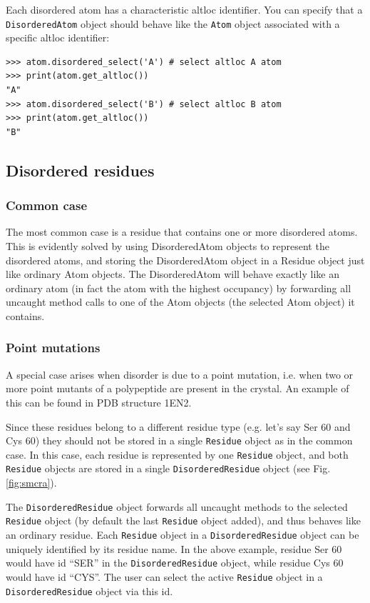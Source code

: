 \documentclass{report}
\begin{document}
Each disordered atom has a characteristic altloc identifier. You can
specify that a \texttt{Disordered\-Atom} object should behave like
the \texttt{Atom} object associated with a specific altloc identifier:

\begin{verbatim}
>>> atom.disordered_select('A') # select altloc A atom
>>> print(atom.get_altloc())
"A"
>>> atom.disordered_select('B') # select altloc B atom
>>> print(atom.get_altloc())
"B"
\end{verbatim}

\subsection{Disordered residues}

\subsubsection*{Common case}

The most common case is a residue that contains one or more disordered atoms.
This is evidently solved by using DisorderedAtom objects to represent the disordered
atoms, and storing the DisorderedAtom object in a Residue object just like ordinary
Atom objects. The DisorderedAtom will behave exactly like an ordinary atom (in
fact the atom with the highest occupancy) by forwarding all uncaught method
calls to one of the Atom objects (the selected Atom object) it contains.

\subsubsection*{Point mutations\label{point mutations}}

A special case arises when disorder is due to a point mutation, i.e. when two
or more point mutants of a polypeptide are present in the crystal. An example
of this can be found in PDB structure 1EN2.

Since these residues belong to a different residue type (e.g. let's
say Ser 60 and Cys 60) they should not be stored in a single \texttt{Residue}
object as in the common case. In this case, each residue is represented
by one \texttt{Residue} object, and both \texttt{Residue} objects
are stored in a single \texttt{Disordered\-Residue} object (see Fig.
\ref{fig:smcra}).

The \texttt{Dis\-ordered\-Residue} object forwards all un\-caught methods to
the selected \texttt{Residue} object (by default the last \texttt{Residue}
object added), and thus behaves like an ordinary residue. Each
\texttt{Residue} object in a \texttt{Disordered\-Residue} object can be
uniquely identified by its residue name. In the above example, residue Ser 60
would have id ``SER'' in the \texttt{Disordered\-Residue} object, while
residue Cys 60 would have id ``CYS''. The user can select the active
\texttt{Residue} object in a \texttt{Disordered\-Residue} object via this id.
\end{document}

